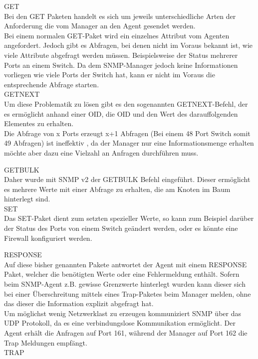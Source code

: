 GET\\

Bei den GET Paketen handelt es sich um jeweils unterschiedliche Arten der Anforderung die vom Manager an den Agent gesendet werden.\\
Bei einem normalen GET-Paket wird ein einzelnes Attribut vom Agenten angefordert. Jedoch gibt es Abfragen, bei denen nicht im Voraus bekannt ist, wie viele Attribute abgefragt werden müssen. Beispielsweise der Status mehrerer Ports an einem Switch. Da dem SNMP-Manager jedoch keine Informationen vorliegen wie viele Ports der Switch hat, kann er nicht im Voraus die entsprechende Abfrage starten.\\

GETNEXT\\

Um diese Problematik zu lösen gibt es den sogenannten GETNEXT-Befehl, der es ermöglicht anhand einer OID, die OID und den Wert des darauffolgenden Elementes zu erhalten.\\

Die Abfrage von x Ports erzeugt x+1 Abfragen (Bei einem 48 Port Switch somit 49 Abfragen) ist ineffektiv , da der Manager nur eine Informationsmenge erhalten möchte aber dazu eine Vielzahl an Anfragen durchführen muss.

GETBULK\\

Daher wurde mit SNMP v2 der GETBULK Befehl eingeführt. Dieser ermöglicht es mehrere Werte mit einer Abfrage zu erhalten, die am Knoten im Baum hinterlegt sind.\\

SET\\
Das SET-Paket dient zum setzten spezieller Werte, so kann zum Beispiel darüber der Status des Ports von einem Switch  geändert werden, oder es könnte eine Firewall konfiguriert werden.

RESPONSE\\
Auf diese bisher genannten Pakete antwortet der Agent mit einem RESPONSE Paket, welcher die benötigten Werte oder eine Fehlermeldung enthält.
Sofern beim SNMP-Agent z.B. gewisse Grenzwerte hinterlegt wurden kann dieser sich bei einer Überschreitung mittels eines Trap-Paketes beim Manager melden, ohne das dieser die Information explizit abgefragt hat.\\
Um möglichst wenig Netzwerklast zu erzeugen kommuniziert SNMP über das UDP Protokoll, da es eine verbindungslose Kommunikation ermöglicht. Der Agent erhält die Anfragen auf Port 161, während der Manager auf Port 162 die Trap Meldungen empfängt.\\
TRAP\\





